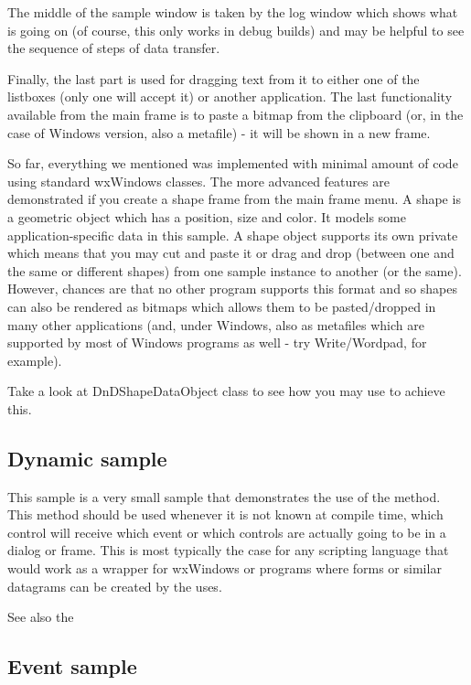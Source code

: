 The middle of the sample window is taken by the log window which shows what is
going on (of course, this only works in debug builds) and may be helpful to see
the sequence of steps of data transfer.

Finally, the last part is used for dragging text from it to either one of the
listboxes (only one will accept it) or another application. The last
functionality available from the main frame is to paste a bitmap from the
clipboard (or, in the case of Windows version, also a metafile) - it will be
shown in a new frame.

So far, everything we mentioned was implemented with minimal amount of code
using standard wxWindows classes. The more advanced features are demonstrated
if you create a shape frame from the main frame menu. A shape is a geometric
object which has a position, size and color. It models some
application-specific data in this sample. A shape object supports its own
private  which means that you may cut and
paste it or drag and drop (between one and the same or different shapes) from
one sample instance to another (or the same). However, chances are that no
other program supports this format and so shapes can also be rendered as
bitmaps which allows them to be pasted/dropped in many other applications
(and, under Windows, also as metafiles which are supported by most of Windows
programs as well - try Write/Wordpad, for example).

Take a look at DnDShapeDataObject class to see how you may use 
 to achieve this.


\subsection{Dynamic sample}\label{sampledynamic}

This sample is a very small sample that demonstrates the use of the
 method. This method
should be used whenever it is not known at compile time, which control
will receive which event or which controls are actually going to be in
a dialog or frame. This is most typically the case for any scripting
language that would work as a wrapper for wxWindows or programs where
forms or similar datagrams can be created by the uses.

See also the 


\subsection{Event sample}\label{sampleevent}

